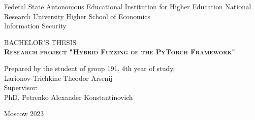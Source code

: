 \begin{titlepage}
	\newpage

	{
		\begin{center}
			Federal State Autonomous Educational Institution for Higher Education
			National Research University Higher School of Economics
			\\
			\bigskip
			Information Security \\
		\end{center}
	}

	\vspace{8em}

	\begin{center}
		{\Large BACHELOR'S THESIS}\\
		\textsc{\textbf{
				Research project
				\linebreak
				"Hybrid Fuzzing of the PyTorch Framework"}}
	\end{center}

	\vspace{4em}

	{
		\hfill\parbox{16cm}{
			\hspace*{5cm}\hspace*{-5cm}Prepared by the student of group 191, 4th year of study,\\
			Larionov-Trichkine Theodor Arsenij\\

			\hspace*{5cm}\hspace*{-5cm}Supervisor:\\
			PhD, Petrenko Alexander Konstantinovich
			\\
		}
	}

	\vspace{\fill}

	\begin{center}
		Moscow 2023
	\end{center}

\end{titlepage}

